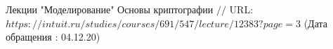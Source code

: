 \makeatletter \renewcommand{} \makeatother
\renewcommand\refname{Список использованных источников}
\begin{thebibliography}{00}
	Лекции "Моделирование"
	Основы криптографии $//$ URL: $https://intuit.ru/studies/courses/691/547/lecture/12383?page=3$ (Дата обращения : 04.12.20)
	
\end{thebibliography}
